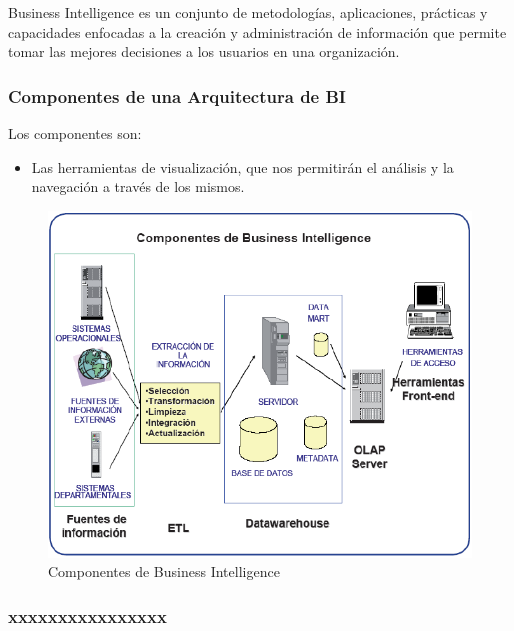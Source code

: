 \documentclass[preprint,12pt]{elsarticle}
\begin{document}
Business Intelligence  es un conjunto de metodologías, aplicaciones, prácticas y capacidades enfocadas a la creación
 y administración de información que permite tomar las mejores decisiones a los usuarios en una organización.

	\subsubsection{\textbf{Componentes de una Arquitectura de BI}}

	Los componentes son:

	\begin{itemize}
	\item Las herramientas de visualización, que nos permitirán el análisis y la navegación a través de los mismos. \cite{referenciaestrella3}

	\end{itemize}

\begin{figure}[htb]
	\begin{center}
		\includegraphics[width=14cm]{./IMAGENES/componentes} 
		\caption{Componentes de Business Intelligence}
	\end{center}
\end{figure}


\subsubsection{\textbf{xxxxxxxxxxxxxxxx}}
\end{document}
